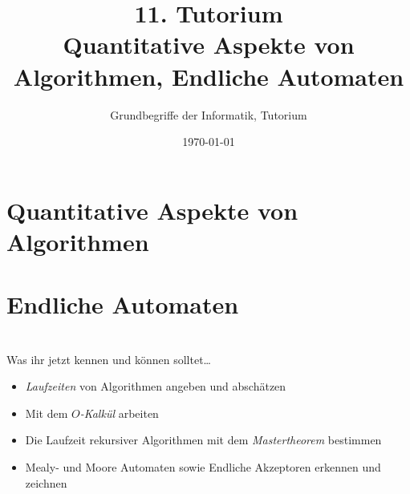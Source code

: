 




\usetikzlibrary{matrix}
\usetikzlibrary{arrows.meta}
\usetikzlibrary{automata}
\usetikzlibrary{tikzmark}

\title[Quantitative Aspekte von Algorithmen, Endliche Automaten]{11. Tutorium\\  Quantitative Aspekte von Algorithmen, Endliche Automaten}
\subtitle{Grundbegriffe der Informatik, Tutorium \hashtag\mytutnumber}
\date{\today}



\titleframe
\roadmap


\section{Quantitative Aspekte von Algorithmen}


\section{Endliche Automaten}


\section{}
	\begin{frame}{Was ihr jetzt kennen und können solltet\dots}
			\begin{itemize}
				\item \emph{Laufzeiten} von Algorithmen angeben und abschätzen
				\item Mit dem \emph{$O$-Kalkül} arbeiten
				\item Die Laufzeit rekursiver Algorithmen mit dem \emph{Mastertheorem} bestimmen
				\item Mealy- und Moore Automaten sowie Endliche Akzeptoren erkennen und zeichnen
			\end{itemize}
	
	\end{frame}
\section{}
\questionframe
\lastframe
{}
